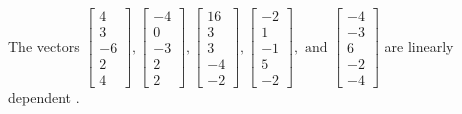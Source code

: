 \begin{exercise}
\begin{exerciseStatement}
  \end{exerciseStatement}
  \begin{exerciseAnswer}
   The vectors \(\left[\begin{array}{r}
4 \\
3 \\
-6 \\
2 \\
4
\end{array}\right] , \left[\begin{array}{r}
-4 \\
0 \\
-3 \\
2 \\
2
\end{array}\right] , \left[\begin{array}{r}
16 \\
3 \\
3 \\
-4 \\
-2
\end{array}\right] , \left[\begin{array}{r}
-2 \\
1 \\
-1 \\
5 \\
-2
\end{array}\right] , \text{ and } \left[\begin{array}{r}
-4 \\
-3 \\
6 \\
-2 \\
-4
\end{array}\right]\) are 
  	 linearly dependent  .
  


  \end{exerciseAnswer}
\end{exercise}